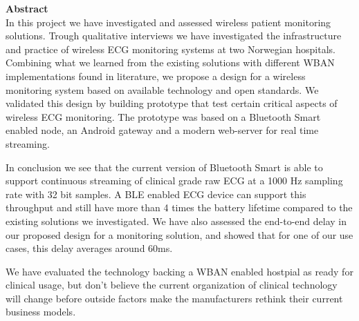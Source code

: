 \noindent \textbf{Abstract}
\\
\newline	
\noindent
In this project we have investigated and assessed wireless patient monitoring solutions. Trough qualitative interviews we have investigated the infrastructure and practice of wireless ECG monitoring systems at two Norwegian hospitals. Combining what we learned from the existing solutions with different WBAN implementations found in literature, we propose a design for a wireless monitoring system based on available technology and open standards. We validated this design by building prototype that test certain critical aspects of wireless ECG monitoring. The prototype was based on a Bluetooth Smart enabled node, an Android gateway and a modern web-server for real time streaming.

In conclusion we see that the current version of Bluetooth Smart is able to support continuous streaming of clinical grade raw ECG at a 1000 Hz sampling rate with 32 bit samples. A BLE enabled ECG device can support this throughput and still have more than 4 times the battery lifetime compared to the existing solutions we investigated. We have also assessed the end-to-end delay in our proposed design for a monitoring solution, and showed that for one of our use cases, this delay averages around 60ms.

We have evaluated the technology backing a WBAN enabled hostpial as ready for clinical usage, but don't believe the current organization of clinical technology will change before outside factors make the manufacturers rethink their current business models. 